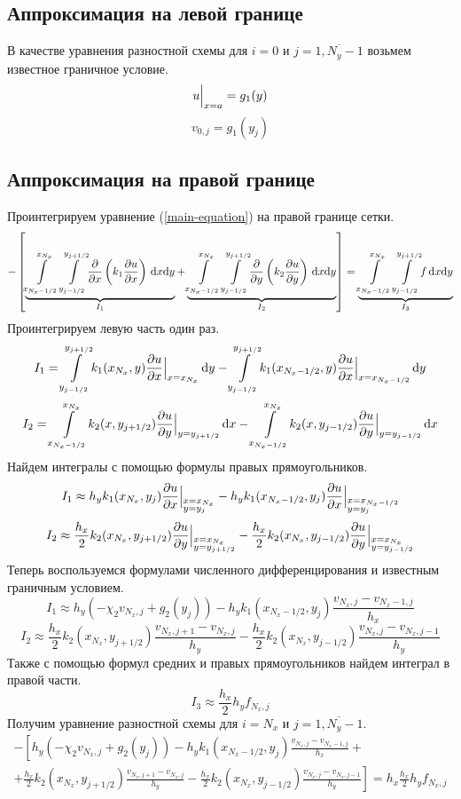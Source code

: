 \subsection{Аппроксимация на левой границе}
В качестве уравнения разностной схемы для $i = 0$ и $j = \overline{1,N_y-1}$ возьмем
известное граничное условие.
\[ u \Big\vert_{x = a} = g_1(y) \]
\[ v_{0,j} = g_1(y_j) \]

\subsection{Аппроксимация на правой границе}
Проинтегрируем уравнение (\ref{main-equation}) на правой границе сетки.
\[
  - \left[
  \underbrace{ \int\limits_{x_{N_x-1/2}}^{x_{N_x}}\int\limits_{y_{j -1/2}}^{y_{j + 1/2}} \! \pdv{x}\left( k_1 \pdv{u}{x} \right) \, \dd x \dd y }_{I_1} +
  \underbrace{ \int\limits_{x_{N_x-1/2}}^{x_{N_x}}\int\limits_{y_{j -1/2}}^{y_{j + 1/2}} \! \pdv{y}\left( k_2 \pdv{u}{y} \right) \, \dd x \dd y }_{I_2}
  \right] =
  \underbrace{ \int\limits_{x_{N_x-1/2}}^{x_{N_x}}\int\limits_{y_{j -1/2}}^{y_{j + 1/2}} \! f \, \dd x \dd y }_{I_3}
\]
Проинтегрируем левую часть один раз.
\[ I_1 = \int\limits_{y_{j -1/2}}^{y_{j + 1/2}} \! k_1(x_{{N_x}},y) \pdv{u}{x} \Big\vert_{x = x_{{N_x}}} \, \dd y - \int\limits_{y_{j - 1/2}}^{y_{j + 1/2}} \! k_1(x_{N_x-1/2},y) \pdv{u}{x} \Big\vert_{x = x_{N_x-1/2}} \, \dd y \]
\[ I_2 = \int\limits_{x_{N_x-1/2}}^{x_{{N_x}}} \! k_2(x,y_{j + 1/2}) \pdv{u}{y} \Big\vert_{y = y_{j + 1/2}} \, \dd x - \int\limits_{x_{N_x-1/2}}^{x_{{N_x}}} \! k_2(x,y_{j - 1/2}) \pdv{u}{y} \Big\vert_{y = y_{j -1/2}} \, \dd x \]
Найдем интегралы с помощью формулы правых прямоугольников.
\[ I_1 \approx h_y k_1(x_{{N_x}},y_{j}) \pdv{u}{x} \Big\vert_{\begin{subarray}{l} x = x_{{N_x}} \\ y = y_{j} \end{subarray}} - h_y k_1(x_{N_x-1/2},y_j) \pdv{u}{x} \Big\vert_{\begin{subarray}{l} x = x_{N_x-1/2} \\ y = y_{j} \end{subarray}} \]
\[ I_2 \approx \frac{h_x}{2} k_2(x_{N_x},y_{j+1/2}) \pdv{u}{y} \Big\vert_{\begin{subarray}{l} x = x_{{N_x}} \\ y = y_{j + 1/2} \end{subarray}} - \frac{h_x}{2} k_2(x_{N_x},y_{j-1/2}) \pdv{u}{y} \Big\vert_{\begin{subarray}{l} x = x_{{N_x}} \\ y = y_{j-1/2} \end{subarray}} \]
Теперь воспользуемся формулами численного дифференцирования и известным граничным условием.
\[ I_1 \approx h_y (- \chi_2 v_{{N_x},j} + g_2(y_j) ) - h_y k_1(x_{N_x-1/2},y_j) \frac{v_{{N_x},j} - v_{{N_x}-1,j}}{h_x} \]
\[ I_2 \approx \frac{h_x}{2} k_2(x_{N_x},y_{j+1/2}) \frac{v_{{N_x},j+1} - v_{{N_x},j}}{h_y} - \frac{h_x}{2} k_2(x_{N_x},y_{j-1/2}) \frac{v_{{N_x},j} - v_{{N_x},j-1}}{h_y} \]
Также с помощью формул средних и правых прямоугольников найдем интеграл в правой части.
\[ I_3 \approx \frac{h_x}{2} h_y f_{N_x,j} \]
Получим уравнение разностной схемы для $i = N_x$ и $j = \overline{1,N_y-1}$.
\begin{multline*}
  - \left[
    h_y (- \chi_2 v_{{N_x},j} + g_2(y_j) ) - h_y k_1(x_{N_x-1/2},y_j) \frac{v_{{N_x},j} - v_{{N_x}-1,j}}{h_x} + \right. \\
  \left. +
  \frac{h_x}{2} k_2(x_{N_x},y_{j+1/2}) \frac{v_{{N_x},j+1} - v_{{N_x},j}}{h_y} - \frac{h_x}{2} k_2(x_{N_x},y_{j-1/2}) \frac{v_{{N_x},j} - v_{{N_x},j-1}}{h_y}
  \right] =
  h_x \frac{h_x}{2} h_y f_{N_x,j}
\end{multline*}

